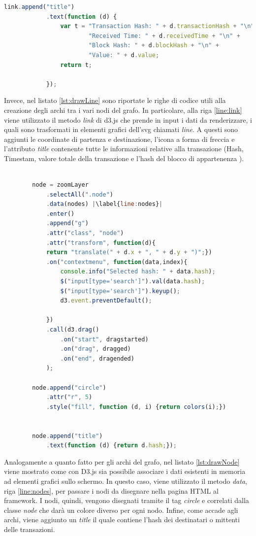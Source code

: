 \begin{itemize}
\begin{lstlisting}[language=Javascript, escapechar=|, label=lst:drawLine, caption={Creazione linee.}]
        link.append("title")
            .text(function (d) {
                var t = "Transaction Hash: " + d.transactionHash + "\n" +
                        "Received Time: " + d.receivedTime + "\n" +
                        "Block Hash: " + d.blockHash + "\n" +
                        "Value: " + d.value;
                return t;

            });
\end{lstlisting}


Invece, nel listato \ref{lst:drawLine} sono riportate le righe di codice utili alla creazione degli archi tra i vari nodi del grafo. In particolare, alla riga \ref{line:link} viene utilizzato il metodo \textit{link} di d3.js che prende in input i dati da renderizzare, i quali sono trasformati in elementi grafici dell'svg chiamati \textit{line}. A questi sono aggiunti le coordinate di partenza e destinazione, l'icona a forma di freccia e l'attributo \textit{title} contenente tutte le informazioni relative alla transazione (Hash, Timestam, valore totale della transazione e l'hash del blocco di appartenenza ).

\begin{lstlisting}[language=Javascript, escapechar=|, label=lst:drawNode, caption={Creazione dei nodi del grafo.}]

        node = zoomLayer
            .selectAll(".node")
            .data(nodes) |\label{line:nodes}|
            .enter()
            .append("g")
            .attr("class", "node")
            .attr("transform", function(d){ 
            return "translate(" + d.x + ", " + d.y + ")";})
            .on("contextmenu", function(data,index){
                console.info("Selected hash: " + data.hash);
                $("input[type='search']").val(data.hash);
                $("input[type='search']").keyup();
                d3.event.preventDefault();

            })
            .call(d3.drag()
                .on("start", dragstarted)
                .on("drag", dragged)
                .on("end", dragended)
            );

        node.append("circle")
            .attr("r", 5)
            .style("fill", function (d, i) {return colors(i);})


        node.append("title")
            .text(function (d) {return d.hash;});
\end{lstlisting}

Analogamente a quanto fatto per gli archi del grafo, nel listato \ref{lst:drawNode} viene mostrato come con D3.js sia possibile associare i dati esistenti in memoria ad elementi grafici sullo schermo. In questo caso, viene utilizzato il metodo \textit{data}, riga \ref{line:nodes}, per passare i nodi da disegnare nella pagina HTML al framework. I nodi, quindi, vengono disegnati tramite il tag \textit{circle} e correlati dalla classe \textit{node} che darà un colore diverso per ogni nodo. Infine, come accade agli archi, viene aggiunto un \textit{title} il quale contiene l'hash dei destinatari o mittenti delle transazioni.
 

\end{itemize}
